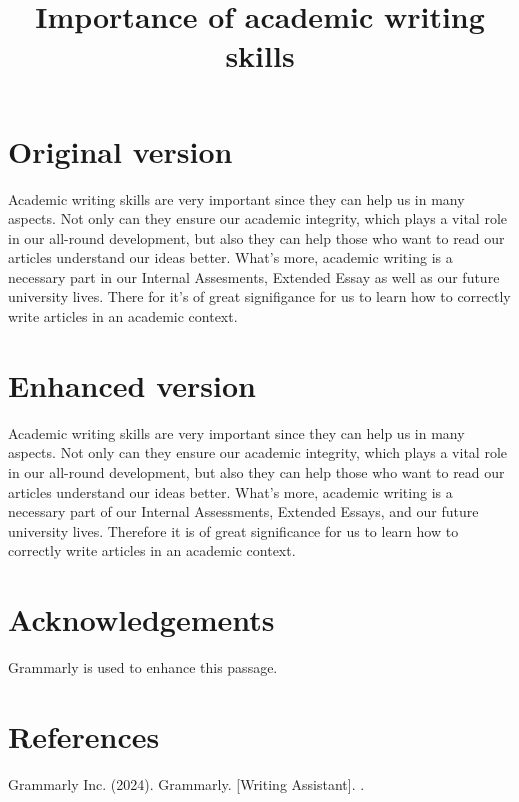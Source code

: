 \documentclass[a4paper]{article}
\title{\textbf{Importance of academic writing skills}}
\begin{document}
\maketitle

\section{Original version}

Academic writing skills are very important since they can help us in many aspects. Not only can they ensure our academic integrity, which plays a vital role in our all-round development, but also they can help those who want to read our articles understand our ideas better. What's more, academic writing is a necessary part in our Internal Assesments, Extended Essay as well as our future university lives. There for it's of great signifigance for us to learn how to correctly write articles in an academic context.

\section{Enhanced version}

Academic writing skills are very important since they can help us in many aspects. Not only can they ensure our academic integrity, which plays a vital role in our all-round development, but also they can help those who want to read our articles understand our ideas better. What's more, academic writing is a necessary part of our Internal Assessments, Extended Essays, and our future university lives. Therefore it is of great significance for us to learn how to correctly write articles in an academic context.

\section{Acknowledgements}

Grammarly is used to enhance this passage.


\section{References}

\newcommand*{\dif}{\mathop{}\!\mathrm{d}}


Grammarly Inc. (2024). Grammarly. [Writing Assistant]. \color{blue}{https://app.grammarly.com/}.

%
%
\end{document}
